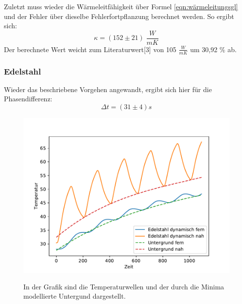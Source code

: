 \documentclass[titlepage = firstcover]{scrartcl}
\begin{document}
  Zuletzt muss wieder die Wärmeleitfähigkeit über Formel \eqref{eqn:wärmeleitungsgl} und der Fehler über dieselbe Fehlerfortpflanzung berechnet werden.
  So ergibt sich:
  \begin{equation*}
    \kappa = (152 \pm 21) \; \frac{W}{mK}
  \end{equation*}
  Der berechnete Wert weicht zum Literaturwert[3] von 105 $\frac{W}{mK}$ um 30,92 \% ab.

  \FloatBarrier

  \newpage

  \subsubsection{Edelstahl}
  Wieder das beschriebene Vorgehen angewandt, ergibt sich hier für die Phasendifferenz:
  \begin{equation*}
    \Delta t = (31 \pm 4) s
  \end{equation*}
  \begin{figure}[h]
    \centering
    \caption{In der Grafik sind die Temperaturwellen und der durch die Minima modellierte Untergund dargestellt.}
    \includegraphics{dynamischstahl2.pdf}
    \label{fig:dynamischstahl}
  \end{figure}
\end{document}

